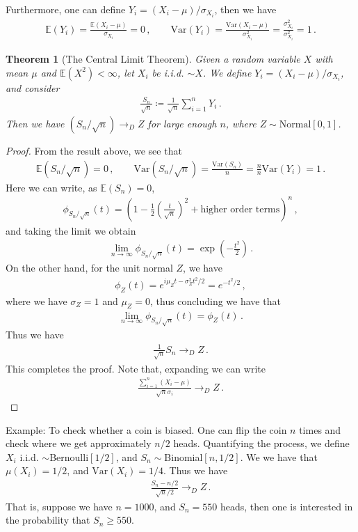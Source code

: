 \documentclass[11pt, onesided]{book}
\theoremstyle{break}
\theoremstyle{break}
\newtheorem{thm}{Theorem}[section]
\newcommand{\example}{\color{green}Example: \color{black}}
\begin{document}
Furthermore, one can define $Y_i = (X_i-\mu)/\sigma_{X_i}$, then we have
\begin{align*}
\mathbb{E}(Y_i) =\frac{ \mathbb{E}(X_i - \mu)}{\sigma_{X_i}}  = 0\,,\qquad
\text{Var}(Y_i) = \frac{\text{Var}(X_i - \mu)  }{\sigma_{X_i}^2}= \frac{\sigma_{X_i}^2}{\sigma_{X_i}^2} = 1\,.
\end{align*}
\begin{thm}[The Central Limit Theorem]
Given a random variable $X$ with mean $\mu$ and $\mathbb{E}(X^2) < \infty$, let $X_i$ be i.i.d. $\sim X$. We define $Y_i = (X_i-\mu)/\sigma_{X_i}$, and consider 
\begin{align*}
\frac{S_n}{\sqrt{n}}\coloneqq \frac{1}{\sqrt{n}}\sum_{i=1}^n Y_i\,.
\end{align*} 
Then we have $(S_n/\sqrt{n}) \to_D Z$ for large enough $n$, where $Z\sim \text{Normal}[0,1]$. 
\end{thm}
\begin{proof}
From the result above, we see that
\begin{align*}
\mathbb{E}(S_n / \sqrt{n}) = 0 \,,\qquad
\text{Var}(S_n/\sqrt{n}) = \frac{\text{Var}(S_n)}{n} = \frac{n}{n}\text{Var}(Y_i)  = 1\,.
\end{align*}
Here we can write, as $\mathbb{E}(S_n) = 0$,
\begin{align*}
\phi_{S_n/\sqrt{n}}(t) = \left( 1 - \frac{1}{2}\left( \frac{t}{\sqrt{n}}\right)^2 + \text{higher order terms}\right)^n\,,
\end{align*}
and taking the limit we obtain
\begin{align*}
\lim_{n\to \infty}\phi_{S_n/\sqrt{n}}(t)  = \exp\left( -\frac{t^2}{2}\right)\,.
\end{align*}
On the other hand, for the unit normal $Z$, we have
\begin{align*}
\phi_Z(t) = e^{i\mu_Z t - \sigma_Z^2t^2/2} = e^{-t^2/2}\,,
\end{align*}
where we have $\sigma_Z = 1$ and $\mu_Z =0$, thus concluding we have that
\begin{align*}
\lim_{n\to \infty}\phi_{S_n/\sqrt{n}}(t) = \phi_Z(t)\,.
\end{align*}
Thus we have
\begin{align*}
\frac{1}{\sqrt{n}}S_n \to_D Z\,.
\end{align*}
This completes the proof. Note that, expanding we can write
\begin{align*}
\frac{\sum_{i=1}^n (X_i-\mu)}{\sqrt{n} \sigma_i} \to_D Z\,.
\end{align*}
\end{proof}
\example To check whether a coin is biased. One can flip the coin $n$ times and check where we get approximately $n/2$ heads. Quantifying the process, we define $X_i$ i.i.d. $\sim $Bernoulli$[1/2]$, and $S_n\sim $Binomial$[n,1/2]$. We we have that $\mu(X_i) = 1/2$, and $\text{Var}(X_i) = 1/4$. Thus we have
\begin{align*}
\frac{S_n - n/2}{\sqrt{n}/2} \to_D Z\,.
\end{align*}
That is, suppose we have $n =1000$, and $S_n = 550$ heads, then one is interested in the probability that $S_n \geq 550$. 
\end{document}
